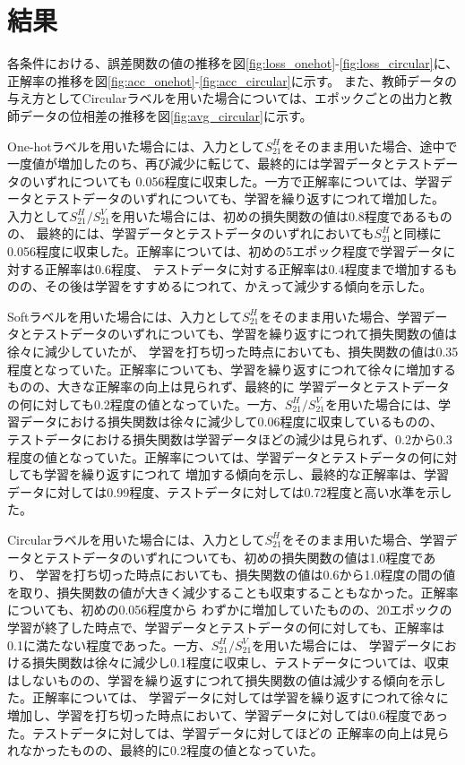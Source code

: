 \documentclass[11pt,a4paper,uplatex]{ujarticle}
\begin{document}
\section{結果}

  各条件における、誤差関数の値の推移を図\ref{fig:loss_onehot}-\ref{fig:loss_circular}に、正解率の推移を図\ref{fig:acc_onehot}-\ref{fig:acc_circular}に示す。
  また、教師データの与え方としてCircularラベルを用いた場合については、エポックごとの出力と教師データの位相差の推移を図\ref{fig:avg_circular}に示す。

  One-hotラベルを用いた場合には、入力として$S_21^H$をそのまま用いた場合、途中で一度値が増加したのち、再び減少に転じて、最終的には学習データとテストデータのいずれについても
  0.056程度に収束した。一方で正解率については、学習データとテストデータのいずれについても、学習を繰り返すにつれて増加した。
  入力として$S_21^H/S_21^V$を用いた場合には、初めの損失関数の値は0.8程度であるものの、
  最終的には、学習データとテストデータのいずれにおいても$S_21^H$と同様に0.056程度に収束した。正解率については、初めの5エポック程度で学習データに対する正解率は0.6程度、
  テストデータに対する正解率は0.4程度まで増加するものの、その後は学習をすすめるにつれて、かえって減少する傾向を示した。

  Softラベルを用いた場合には、入力として$S_21^H$をそのまま用いた場合、学習データとテストデータのいずれについても、学習を繰り返すにつれて損失関数の値は徐々に減少していたが、
  学習を打ち切った時点においても、損失関数の値は0.35程度となっていた。正解率についても、学習を繰り返すにつれて徐々に増加するものの、大きな正解率の向上は見られず、最終的に
  学習データとテストデータの何に対しても0.2程度の値となっていた。一方、$S_21^H/S_21^V$を用いた場合には、学習データにおける損失関数は徐々に減少して0.06程度に収束しているものの、
  テストデータにおける損失関数は学習データほどの減少は見られず、0.2から0.3程度の値となっていた。正解率については、学習データとテストデータの何に対しても学習を繰り返すにつれて
  増加する傾向を示し、最終的な正解率は、学習データに対しては0.99程度、テストデータに対しては0.72程度と高い水準を示した。

  Circularラベルを用いた場合には、入力として$S_21^H$をそのまま用いた場合、学習データとテストデータのいずれについても、初めの損失関数の値は1.0程度であり、
  学習を打ち切った時点においても、損失関数の値は0.6から1.0程度の間の値を取り、損失関数の値が大きく減少することも収束することもなかった。正解率についても、初めの0.056程度から
  わずかに増加していたものの、20エポックの学習が終了した時点で、学習データとテストデータの何に対しても、正解率は0.1に満たない程度であった。一方、$S_21^H/S_21^V$を用いた場合には、
  学習データにおける損失関数は徐々に減少し0.1程度に収束し、テストデータについては、収束はしないものの、学習を繰り返すにつれて損失関数の値は減少する傾向を示した。正解率については、
  学習データに対しては学習を繰り返すにつれて徐々に増加し、学習を打ち切った時点において、学習データに対しては0.6程度であった。テストデータに対しては、学習データに対してほどの
  正解率の向上は見られなかったものの、最終的に0.2程度の値となっていた。
\end{document}
